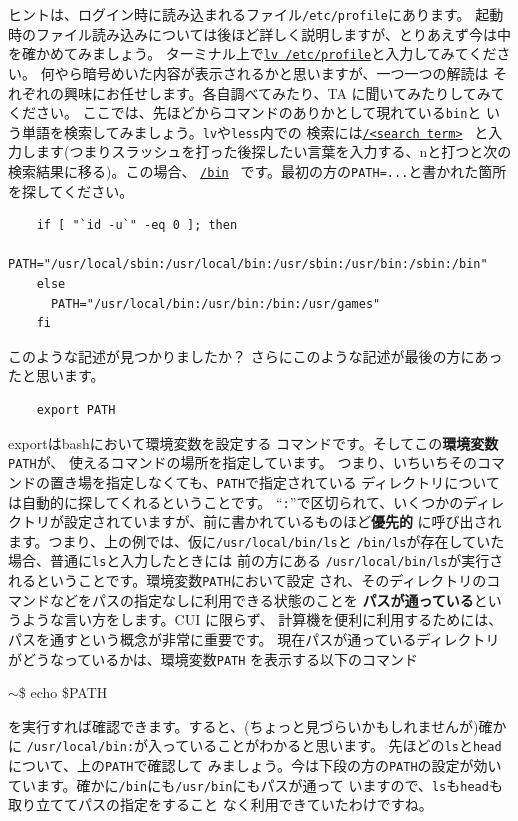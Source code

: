 \documentclass[a4j]{ltjsreport}
\begin{document}
    \vspace*{3mm}

    ヒントは、ログイン時に読み込まれるファイル\verb+/etc/profile+にあります。
    起動時のファイル読み込みについては後ほど詳しく説明しますが、とりあえず今は中を確かめてみましょう。
    ターミナル上で\underline{\texttt{lv /etc/profile}}と入力してみてください。
    何やら暗号めいた内容が表示されるかと思いますが、一つ一つの解読は
    それぞれの興味にお任せします。各自調べてみたり、TA に聞いてみたりしてみてください。
    ここでは、先ほどからコマンドのありかとして現れている\verb+bin+と
    いう単語を検索してみましょう。\verb+lv+や\verb+less+内での
    検索には\underline{\texttt{/<search term>}} \return~と入力します(つまりスラッシュを打った後探したい言葉を入力する、nと打つと次の検索結果に移る)。この場合、
    \underline{\texttt{/bin}} \return~です。最初の方の\verb+PATH=...+と書かれた箇所を探してください。
    \begin{verbatim}
    if [ "`id -u`" -eq 0 ]; then
      PATH="/usr/local/sbin:/usr/local/bin:/usr/sbin:/usr/bin:/sbin:/bin"
    else
      PATH="/usr/local/bin:/usr/bin:/bin:/usr/games"
    fi
    \end{verbatim}

    このような記述が見つかりましたか？
    さらにこのような記述が最後の方にあったと思います。
    \begin{verbatim}
    export PATH
    \end{verbatim}
    exportはbashにおいて環境変数を設定する
    コマンドです。そしてこの\textbf{環境変数} \verb+PATH+が、
    使えるコマンドの場所を指定しています。
    つまり、いちいちそのコマンドの置き場を指定しなくても、\verb+PATH+で指定されている
    ディレクトリについては自動的に探してくれるということです。
    ``\verb+:+''で区切られて、いくつかのディレクトリが設定されていますが、前に書かれているものほど\textbf{優先的}
    に呼び出されます。つまり、上の例では、仮に\verb+/usr/local/bin/ls+と
    \verb+/bin/ls+が存在していた場合、普通に\verb+ls+と入力したときには
    前の方にある
    \verb+/usr/local/bin/ls+が実行されるということです。環境変数\verb+PATH+において設定
    され、そのディレクトリのコマンドなどをパスの指定なしに利用できる状態のことを
    \textbf{パスが通っている}というような言い方をします。CUI に限らず、
    計算機を便利に利用するためには、パスを通すという概念が非常に重要です。
    現在パスが通っているディレクトリがどうなっているかは、環境変数\verb+PATH+
    を表示する以下のコマンド
    \begin{screen}
    $\sim$\$ echo \$PATH
    \end{screen}
    を実行すれば確認できます。すると、(ちょっと見づらいかもしれませんが)確かに
    \verb+/usr/local/bin:+が入っていることがわかると思います。
    先ほどの\verb+ls+と\verb+head+について、上の\verb+PATH+で確認して
    みましょう。今は下段の方の\verb+PATH+の設定が効いています。確かに\verb+/bin+にも\verb+/usr/bin+にもパスが通って
    いますので、\verb+ls+も\verb+head+も取り立ててパスの指定をすること
    なく利用できていたわけですね。
\end{document}
